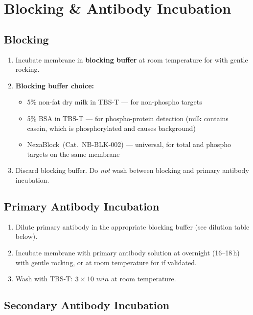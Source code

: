 
\section{Blocking \& Antibody Incubation}
\label{sec:antibodies}

\subsection{Blocking}

\begin{enumerate}
  \item Incubate membrane in \textbf{blocking buffer} at room temperature for
         with gentle rocking.
  \item \textbf{Blocking buffer choice:}
  \begin{itemize}
    \item 5\% non-fat dry milk in TBS-T — for non-phospho targets
    \item 5\% BSA in TBS-T — for phospho-protein detection (milk contains casein,
          which is phosphorylated and causes background)
    \item NexaBlock\texttrademark~(Cat.\ NB-BLK-002) — universal, for total and
          phospho targets on the same membrane
  \end{itemize}
  \item Discard blocking buffer. Do \textit{not} wash between blocking and
        primary antibody incubation.
\end{enumerate}

\subsection{Primary Antibody Incubation}

\begin{enumerate}
  \item Dilute primary antibody in the appropriate blocking buffer (see
        dilution table below).
  \item Incubate membrane with primary antibody solution at  overnight
        (16--18\,h) with gentle rocking, or at room temperature for 
        if validated.
  \item Wash with TBS-T: $3 \times 10~min$ at room temperature.
\end{enumerate}

\subsection{Secondary Antibody Incubation}

